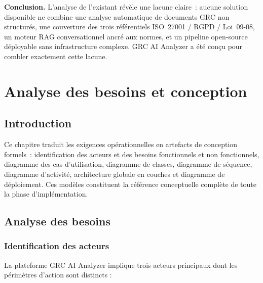 \documentclass[a4paper,12pt,oneside]{report}
\begin{document}
	\begin{tcolorbox}[critiquestyle]
		\textbf{Conclusion.}
		L'analyse de l'existant r\'ev\`ele une lacune claire~: aucune solution disponible
		ne combine une analyse automatique de documents GRC non structur\'es,
		une couverture des trois r\'ef\'erentiels ISO~27001 / RGPD / Loi~09-08,
		un moteur RAG conversationnel ancr\'e aux normes, et un pipeline
		open-source d\'eployable sans infrastructure complexe.
		GRC AI Analyzer a \'et\'e con\c{c}u pour combler exactement cette lacune.
	\end{tcolorbox}
	\chapter{Analyse des besoins et conception}
	
	\section{Introduction}
	
	Ce chapitre traduit les exigences op\'erationnelles en artefacts de conception formels~: identification des acteurs et des besoins fonctionnels et non fonctionnels, diagramme des cas d'utilisation, diagramme de classes, diagramme de s\'equence, diagramme d'activit\'e, architecture globale en couches et diagramme de d\'eploiement. Ces mod\`eles constituent la r\'ef\'erence conceptuelle compl\`ete de toute la phase d'impl\'ementation.
	
	\section{Analyse des besoins}
	
	\subsection{Identification des acteurs}
	
	La plateforme GRC AI Analyzer implique trois acteurs principaux dont les
	périmètres d'action sont distincts :
	
\end{document}
